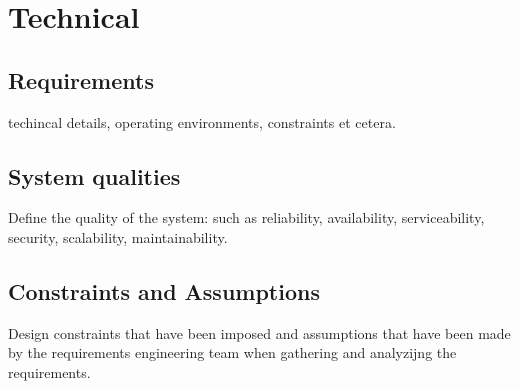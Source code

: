 \chapter{Technical}

\section{Requirements}
techincal details, operating environments, constraints et cetera.

\section{System qualities}
Define the quality of the system: such as reliability, availability, serviceability, security, scalability, maintainability.

\section{Constraints and Assumptions}
Design constraints that have been imposed and assumptions that have been made by the requirements engineering team when gathering and analyzijng the requirements.
